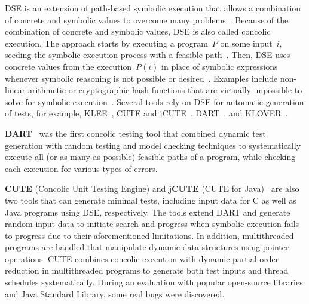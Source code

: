 \documentclass{article}
\begin{document}
\ac{DSE} is an extension of path-based symbolic execution that allows a combination of concrete and symbolic values to overcome many problems~\cite{Fraser_2013}. Because of the combination of concrete and symbolic values, \ac{DSE} is also called concolic execution. The approach starts by executing a program~$P$ on some input~$i$, seeding the symbolic execution process with a feasible path~\cite{Gupta2000,Korel1992}. Then, \ac{DSE} uses concrete values from the execution~$P(i)$ in place of symbolic expressions whenever symbolic reasoning is not possible or desired~\cite{Cadar2005}. Examples include non-linear arithmetic or cryptographic hash functions that are virtually impossible to solve for symbolic execution~\cite{Ball2015}. Several tools rely on \ac{DSE} for automatic generation of tests, for example, KLEE~\cite{cadar2008klee}, CUTE and jCUTE~\cite{Sen2006}, DART~\cite{Godefroid_2005}, and KLOVER~\cite{Li2011}.

\textbf{DART}~\cite{Godefroid_2005} was the first concolic testing tool that combined dynamic test generation with random testing and model checking techniques to systematically execute all (or as many as possible) feasible paths of a program, while checking each execution for various types of errors. 


\textbf{CUTE} (Concolic Unit Testing Engine) and \textbf{jCUTE} (CUTE for Java)~\cite{Sen2006} are also two tools that can generate minimal tests, including input data for C as well as Java programs using \ac{DSE}, respectively. The tools extend DART and generate random input data to initiate search and progress when symbolic execution fails to progress due to their aforementioned limitations. In addition, multithreaded programs are handled that manipulate dynamic data structures using pointer operations. CUTE combines concolic execution with dynamic partial order reduction in multithreaded programs to generate both test inputs and thread schedules systematically. During an evaluation with popular open-source libraries and Java Standard Library, some real bugs were discovered. 
\end{document}
